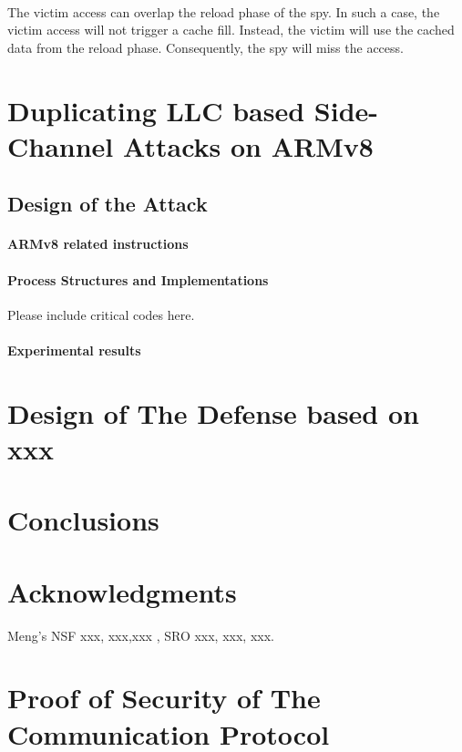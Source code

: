 \documentclass{sig-alternate}
\begin{document}
\\
\indent
The victim access can overlap the reload phase of the spy. In such a case, the victim access will not trigger a cache fill. Instead, the victim will use the cached data from the reload phase. Consequently, the spy will miss the access.





\section{Duplicating LLC based Side-Channel Attacks on ARMv8}

\subsection{Design of the Attack}

\paragraph{ARMv8 related instructions}

\paragraph{Process Structures and Implementations}

Please include critical codes here.

\paragraph{Experimental results}

\section{Design of The Defense based on xxx}



\section{Conclusions}

\section{Acknowledgments}
Meng's NSF xxx, xxx,xxx , SRO xxx, xxx, xxx.




\balancecolumns

\appendix

\section{Proof of Security of The Communication Protocol}
\end{document}
